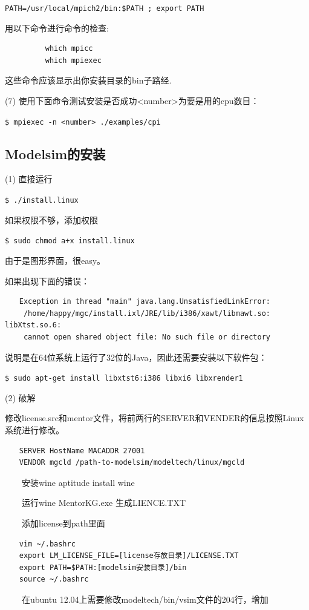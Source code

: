 \verb"PATH=/usr/local/mpich2/bin:$PATH ; export PATH"

用以下命令进行命令的检查:
\begin{verbatim}
　　      which mpicc
　　      which mpiexec
\end{verbatim}

这些命令应该显示出你安装目录的bin子路经.

(7) 使用下面命令测试安装是否成功<number>为要是用的cpu数目：

\verb"$ mpiexec -n <number> ./examples/cpi"

\subsection{Modelsim的安装}
(1) 直接运行

\verb"$ ./install.linux"

如果权限不够，添加权限  

\verb"$ sudo chmod a+x install.linux"

由于是图形界面，很easy。

如果出现下面的错误：
\begin{verbatim}
　　Exception in thread "main" java.lang.UnsatisfiedLinkError:
　　 /home/happy/mgc/install.ixl/JRE/lib/i386/xawt/libmawt.so: libXtst.so.6: 
　　 cannot open shared object file: No such file or directory
\end{verbatim}

说明是在64位系统上运行了32位的Java，因此还需要安装以下软件包：

\verb"$ sudo apt-get install libxtst6:i386 libxi6 libxrender1"

(2) 破解

修改license.src和mentor文件，将前两行的SERVER和VENDER的信息按照Linux系统进行修改。
\begin{verbatim}
　　SERVER HostName MACADDR 27001
　　VENDOR mgcld /path-to-modelsim/modeltech/linux/mgcld
\end{verbatim}

　　安装wine aptitude install wine

　　运行wine MentorKG.exe 生成LIENCE.TXT

　　添加license到path里面
\begin{verbatim}
　　vim ~/.bashrc
　　export LM_LICENSE_FILE=[license存放目录]/LICENSE.TXT   
　　export PATH=$PATH:[modelsim安装目录]/bin
　　source ~/.bashrc
\end{verbatim}

　　在ubuntu 12.04上需要修改modeltech/bin/vsim文件的204行，增加

